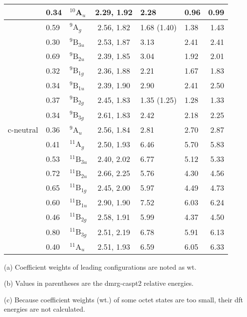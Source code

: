\begin{refsection}
\begin{table}[htb!]
\begin{threeparttable}
\begin{tabular}{lllcllr}
		& 0.34   & $^{10}$A$_u$     & 2.29, 1.92   & 2.28        & 0.96 & 0.99  \\
		\midrule
		& 0.59   & $^9$A$_g$        & 2.56, 1.82   & 1.68 (1.40) & 1.38 & 1.43  \\
		& 0.30   & $^9$B$_{3u}$     & 2.53, 1.87   & 3.13        & 2.41 & 2.41  \\
		& 0.69   & $^9$B$_{2u}$     & 2.39, 1.85   & 3.04        & 1.92 & 2.01  \\
		& 0.32   & $^9$B$_{1g}$     & 2.36, 1.88   & 2.21        & 1.67 & 1.83  \\
		& 0.34   & $^9$B$_{1u}$     & 2.39, 1.90   & 2.90        & 2.41 & 2.50  \\
		& 0.37   & $^9$B$_{2g}$     & 2.45, 1.83   & 1.35 (1.25) & 1.28 & 1.33  \\
		& 0.34   & $^9$B$_{3g}$     & 2.61, 1.83   & 2.42        & 2.18 & 2.25  \\
c-neutral & 0.36 & $^9$A$_u$        & 2.56, 1.84   & 2.81   	 & 2.70 & 2.87  \\
		& 0.41   & $^{11}$A$_g$     & 2.50, 1.93   & 6.46        & 5.70 & 5.83  \\
		& 0.53   & $^{11}$B$_{3u}$  & 2.40, 2.02   & 6.77        & 5.12 & 5.33  \\
		& 0.72   & $^{11}$B$_{2u}$  & 2.66, 2.25   & 5.76        & 4.30 & 4.56  \\
		& 0.65   & $^{11}$B$_{1g}$  & 2.45, 2.00   & 5.97        & 4.49 & 4.73  \\
		& 0.60   & $^{11}$B$_{1u}$  & 2.90, 1.90   & 7.52        & 6.03 & 6.24  \\
		& 0.46   & $^{11}$B$_{2g}$  & 2.58, 1.91   & 5.99        & 4.37 & 4.50  \\
		& 0.80   & $^{11}$B$_{3g}$  & 2.51, 2.19   & 6.78        & 5.91 & 6.13  \\
		& 0.40   & $^{11}$A$_u$     & 2.51, 1.93   & 6.59        & 6.05 & 6.33  \\
		\bottomrule
	\end{tabular}
	 \begin{tablenotes}
	 \item[(a)] Coefficient weights of leading configurations are noted as wt.
	 \item[(b)] Values in parentheses are the \acrshort{dmrg}-\acrshort{caspt2} relative energies.
	 \item[(c)] Because coefficient weights (wt.) of some octet states are too small, their \acrshort{dft} energies are not calculated.
	\end{tablenotes}
	\end{threeparttable}
\end{table}



\end{refsection}
